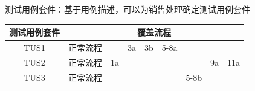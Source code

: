 测试用例套件：基于用例描述，可以为销售处理确定测试用例套件
\begin{table}[H]
    \centering
    \begin{tabular}{|c|cccccccc|}
    \hline
    测试用例套件 & \multicolumn{8}{c|}{覆盖流程}                                                                                                                                                             \\ \hline
    TUS1   & \multicolumn{1}{c|}{正常流程} & \multicolumn{1}{c|}{}   & \multicolumn{1}{c|}{3a} & \multicolumn{1}{c|}{3b} & \multicolumn{1}{c|}{5-8a} & \multicolumn{1}{c|}{}     & \multicolumn{1}{c|}{}   &     \\ \hline
    TUS2   & \multicolumn{1}{c|}{正常流程} & \multicolumn{1}{c|}{1a} & \multicolumn{1}{c|}{}   & \multicolumn{1}{c|}{}   & \multicolumn{1}{c|}{}     & \multicolumn{1}{c|}{}     & \multicolumn{1}{c|}{9a} & 11a \\ \hline
    TUS3   & \multicolumn{1}{c|}{正常流程} & \multicolumn{1}{c|}{}   & \multicolumn{1}{c|}{}   & \multicolumn{1}{c|}{}   & \multicolumn{1}{c|}{}     & \multicolumn{1}{c|}{5-8b} & \multicolumn{1}{c|}{}   &     \\ \hline
    \end{tabular}
    \vspace{-1em}
\end{table}


